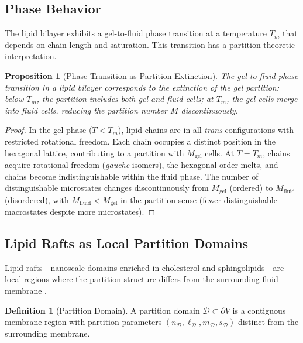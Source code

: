 \documentclass[twocolumn,10pt]{article}
\newtheorem{proposition}[theorem]{Proposition}
\theoremstyle{definition}
\newtheorem{definition}[theorem]{Definition}
\theoremstyle{remark}
\begin{document}
\subsection{Phase Behavior}

The lipid bilayer exhibits a gel-to-fluid phase transition at a temperature $T_m$ that depends on chain length and saturation. This transition has a partition-theoretic interpretation.

\begin{proposition}[Phase Transition as Partition Extinction]
\label{prop:phase_transition}
The gel-to-fluid phase transition in a lipid bilayer corresponds to the extinction of the gel partition: below $T_m$, the partition includes both gel and fluid cells; at $T_m$, the gel cells merge into fluid cells, reducing the partition number $M$ discontinuously.
\end{proposition}

\begin{proof}
In the gel phase ($T < T_m$), lipid chains are in all-\emph{trans} configurations with restricted rotational freedom. Each chain occupies a distinct position in the hexagonal lattice, contributing to a partition with $M_{\mathrm{gel}}$ cells. At $T = T_m$, chains acquire rotational freedom (\emph{gauche} isomers), the hexagonal order melts, and chains become indistinguishable within the fluid phase. The number of distinguishable microstates changes discontinuously from $M_{\mathrm{gel}}$ (ordered) to $M_{\mathrm{fluid}}$ (disordered), with $M_{\mathrm{fluid}} < M_{\mathrm{gel}}$ in the partition sense (fewer distinguishable macrostates despite more microstates).
\end{proof}

\subsection{Lipid Rafts as Local Partition Domains}

Lipid rafts---nanoscale domains enriched in cholesterol and sphingolipids---are local regions where the partition structure differs from the surrounding fluid membrane \cite{singer1972fluid}.

\begin{definition}[Partition Domain]
\label{def:partition_domain}
A partition domain $\mathcal{D} \subset \partial V$ is a contiguous membrane region with partition parameters $(n_{\mathcal{D}}, \ell_{\mathcal{D}}, m_{\mathcal{D}}, s_{\mathcal{D}})$ distinct from the surrounding membrane.
\end{definition}
\end{document}
